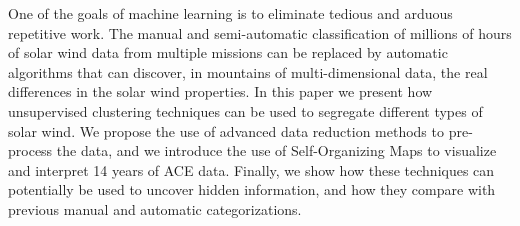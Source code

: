 One of the goals of machine learning is to eliminate tedious and arduous repetitive work. The manual and semi-automatic classification of millions of hours of solar wind data from multiple missions can be replaced by automatic algorithms that can discover, in mountains of multi-dimensional data, the real differences in the solar wind properties. In this paper we present how unsupervised clustering techniques can be used to segregate different types of solar wind. We propose the use of advanced data reduction methods to pre-process the data, and we introduce the use of Self-Organizing Maps to visualize and interpret 14 years of ACE data. Finally, we show how these techniques can potentially be used to uncover hidden information, and how they compare with previous manual and automatic categorizations.